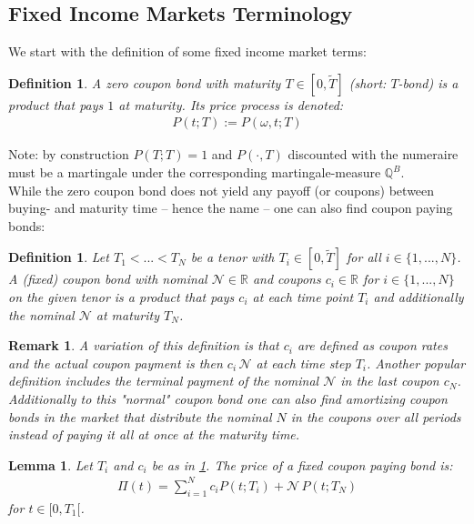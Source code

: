 \documentclass[12pt]{article}
\newtheorem{lemma}[theorem]{Lemma}
\newtheorem{remark}[theorem]{Remark}
\newtheorem{definition}[theorem]{Definition}
\begin{document}
	\subsection{Fixed Income Markets Terminology}
	We start with the definition of some fixed income market terms:
	\begin{definition}
		A \emph{zero coupon bond} with maturity $T \in [0,\tilde{T}]$ (short: $T$-bond) is a product that pays $1$ at maturity. Its price process is denoted:
		\begin{align*}
			P(t;T) := P(\omega,t;T)
		\end{align*}
	\end{definition}
	Note: by construction $P(T;T) = 1$ and $P(\cdot, T)$ discounted with the numeraire must be a martingale under the corresponding martingale-measure $\mathbb{Q}^B$.\\
	While the zero coupon bond does not yield any payoff (or coupons) between buying- and maturity time -- hence the name -- one can also find coupon paying bonds:
	\begin{definition}\label{def:couponbond}
		Let $T_1 < ... < T_N$ be a tenor with $T_i \in [0,\tilde{T}]$ for all $i\in \{1, ...,N\}$.\\
		A \emph{(fixed) coupon bond} with nominal $\mathcal{N} \in \mathbb{R}$ and  coupons $c_i \in \mathbb{R}$ for $i\in \{1, ...,N\}$ on the given tenor is a product that pays $c_i$ at each time point $T_i$ and additionally the nominal $\mathcal{N}$ at maturity $T_N$.
	\end{definition}
	\begin{remark}
		A variation of this definition is that $c_i$ are defined as coupon rates and the actual coupon payment is then $c_i\, \mathcal{N}$ at each time step $T_i$. Another popular definition includes the terminal payment of the nominal $\mathcal{N}$ in the last coupon $c_N$. \\
		Additionally to this "normal" coupon bond one can also find \emph{amortizing} coupon bonds in the market that distribute the nominal $N$ in the coupons over all periods instead of paying it all at once at the maturity time.
	\end{remark}
	\begin{lemma}
		Let $T_i$ and $c_i$ be as in \cref{def:couponbond}. 
		The price of a fixed coupon paying bond is:
		\begin{align}\label{eq:pricecouponbond}
			\Pi(t)=\sum_{i=1}^{N}c_i P(t;T_i) + \mathcal{N}\,P(t;T_N)
		\end{align}
		for $t\in [0,T_1[$.
	\end{lemma}
\end{document}
